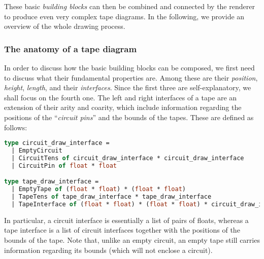 \documentclass{article}
\begin{document}
These basic \emph{building blocks} can then be combined and connected by the renderer to produce even very complex tape diagrams. In the following, we provide an overview of the whole drawing process.

\pagebreak
\subsubsection{The anatomy of a tape diagram}
In order to discuss how the basic building blocks can be composed, we first need to discuss what their fundamental properties are. Among these are their \emph{position}, \emph{height}, \emph{length}, and their \emph{interfaces}. Since the first three are self-explanatory, we shall focus on the fourth one. The {left} and {right interfaces} of a tape are an extension of their arity and coarity, which include information regarding the positions of the ``\emph{circuit pins}'' and the bounds of the tapes. These are defined as follows:

\begin{lstlisting}[language=ml]
 type circuit_draw_interface =
  | EmptyCircuit
  | CircuitTens of circuit_draw_interface * circuit_draw_interface
  | CircuitPin of float * float

type tape_draw_interface =
  | EmptyTape of (float * float) * (float * float)
  | TapeTens of tape_draw_interface * tape_draw_interface
  | TapeInterface of (float * float) * (float * float) * circuit_draw_interface
\end{lstlisting}
In particular, a circuit interface is essentially a list of pairs of floats, whereas a tape interface is a list of circuit interfaces together with the positions of the bounds of the tape. Note that, unlike an empty circuit, an empty tape still carries information regarding its bounds (which will not enclose a circuit).
\end{document}

